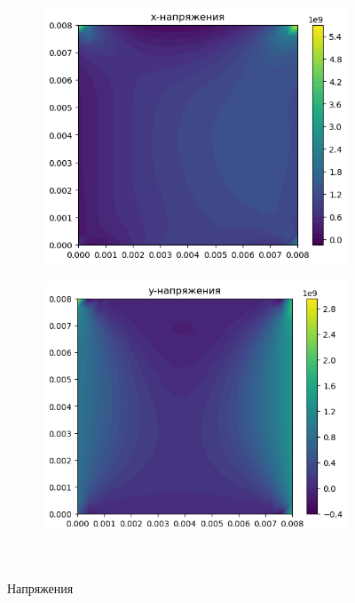 \documentclass[12pt, a4paper]{article}
\begin{document}
\begin{figure}[H]
\begin{subfigure}[H]{0.4\textwidth}
		\includegraphics[width=\textwidth]{stress0}
	\end{subfigure}
	\qquad\qquad
	\begin{subfigure}[H]{0.4\textwidth}
		\includegraphics[width=\textwidth]{stressy0}
	\end{subfigure}	
	\\[0.2cm]
	\caption{Напряжения}
\end{figure}	
\end{document}
